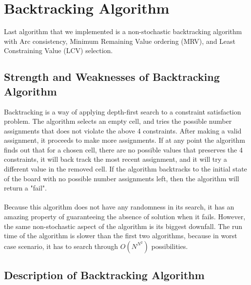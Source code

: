 \documentclass[12pt, a4paper]{article}
\begin{document}
	\section{Backtracking Algorithm}
		Last algorithm that we implemented is a non-stochastic backtracking algorithm with Arc consistency, Minimum Remaining Value ordering (MRV), and Least Constraining Value (LCV) selection.
		\subsection{Strength and Weaknesses of Backtracking Algorithm}
			Backtracking is a way of applying depth-first search to a constraint satisfaction problem. The algorithm selects an empty cell, and tries the possible number assignments that does not violate the above 4 constraints. After making a valid assignment, it proceeds to make more assignments. If at any point the algorithm finds out that for a chosen cell, there are no possible values that preserves the 4 constraints, it will back track the most recent assignment, and it will try a different value in the removed cell. If the algorithm backtracks to the initial state of the board with no possible number assignments left, then the algorithm will return a "fail".\\\\
			Because this algorithm does not have any randomness in its search, it has an amazing property of guaranteeing the absence of solution when it fails. However, the same non-stochastic aspect of the algorithm is its biggest downfall. The run time of the algorithm is slower than the first two algorithms, because in worst case scenario, it has to search through $O(N^{N^2})$ possibilities.
		\subsection{Description of Backtracking Algorithm}
\end{document}
